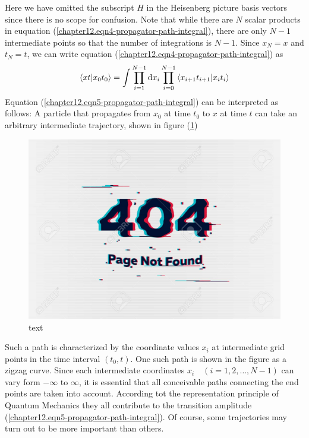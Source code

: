 		Here we have omitted the subscript $H$ in the Heisenberg picture basis vectors since there is no scope for confusion. Note that while there are $N$ scalar products in euquation (\ref{chapter12.eqn4-propagator-path-integral}), there are only $N-1$ intermediate points so that the number of integrations is $N-1$. Since $x_N = x$ and $t_N= t$, we can write equation (\ref{chapter12.eqn4-propagator-path-integral}) as
		\begin{equation}
			\braket{x t}{x_0 t_0} = \int \prod_{i=1}^{N-1} \dd{x_i} \prod_{i=0}^{N-1} \braket{x_{i+1} t_{i+1}}{x_i t_i}
			\label{chapter12.eqn5-propagator-path-integral}
		\end{equation}
		Equation (\ref{chapter12.eqn5-propagator-path-integral}) can be interpreted as follows: A particle that propagates from $x_0$ at time $t_0$ to $x$ at time $t$ can take an arbitrary intermediate trajectory, shown in figure (\ref{chapter12.fig1-propagator-path-integral-trajectory})
		\begin{figure}
			\centering
			\includegraphics[width=0.5\linewidth]{Pictures/not-found.jpg}
			\caption{text}
			\label{chapter12.fig1-propagator-path-integral-trajectory}
		\end{figure}
	
	Such a path is characterized by the coordinate values $x_i$ at intermediate grid points in the time interval $(t_0,t)$. One such path is shown in the figure as a zigzag curve. Since each intermediate coordinates $x_i\quad (i=1,2,\ldots,N-1)$ can vary form $-\infty$ to $\infty$, it is essential that all conceivable paths connecting the end points are taken into account. According tot the representation principle of Quantum Mechanics they all contribute to the transition amplitude (\ref{chapter12.eqn5-propagator-path-integral}). Of course, some trajectories may turn out to be more important than others.
	
